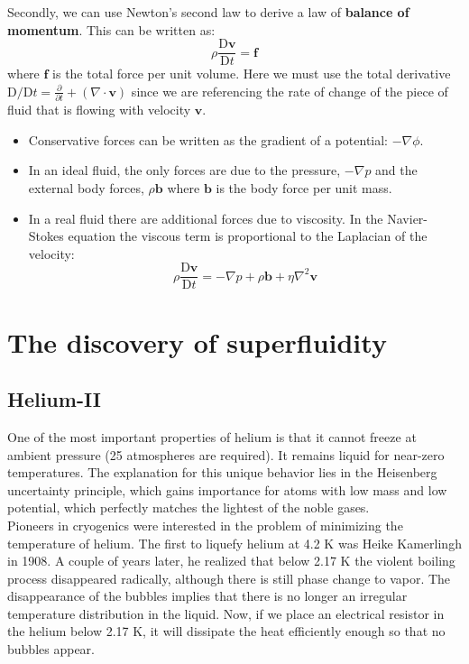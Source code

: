 \documentclass{article}
\begin{document}
Secondly, we can use Newton's second law to derive a law of
\textbf{balance of momentum}.	This can be written as:
\[\rho\frac{\mathrm{D}\mathbf{v}}{\mathrm{D} t}= \mathbf{f}\]
where $\mathbf{f}$ is the total force per unit volume.	Here we must use the
total derivative
$\mathrm{D}/\mathrm{D}t = \frac{\partial}{\partial t} + (\nabla \cdot
    \mathbf{v})$
since we are referencing the rate of change of the piece of fluid that is
flowing with velocity $\mathbf{v}$.
\begin{itemize}
    \item Conservative forces can be written as the gradient of a potential: $-\nabla\phi$.
    \item In an ideal fluid, the only forces are due to the pressure, $-\nabla p$ and the external body forces, $\rho \mathbf{b}$ where $\mathbf{b}$ is the body force per unit mass.
    \item In a real fluid there are additional forces due to viscosity. In the Navier-Stokes equation the viscous term is proportional to the Laplacian of the velocity:
\[\rho\frac{\mathrm{D}\mathbf{v}}{\mathrm{D} t}=-\nabla p + \rho \mathbf{b} +
    \eta\nabla^2{\mathbf{v}}\]
\end{itemize}


\section{The discovery of superfluidity}

\subsection{Helium-II}
One of the most important properties of helium is that it cannot freeze at ambient pressure (25 atmospheres are required). It remains liquid for near-zero temperatures. The explanation for this unique behavior lies in the Heisenberg uncertainty principle, which gains importance for atoms with low mass and low potential, which perfectly matches the lightest of the noble gases.
\\

Pioneers in cryogenics were interested in the problem of minimizing the temperature of helium. The first to liquefy helium at 4.2 K was Heike Kamerlingh in 1908. A couple of years later, he realized that below 2.17 K the violent boiling process disappeared radically, although there is still phase change to vapor. The disappearance of the bubbles implies that there is no longer an irregular temperature distribution in the liquid. Now, if we place an electrical resistor in the helium below 2.17 K, it will dissipate the heat efficiently enough so that no bubbles appear. 
\\
\end{document}

